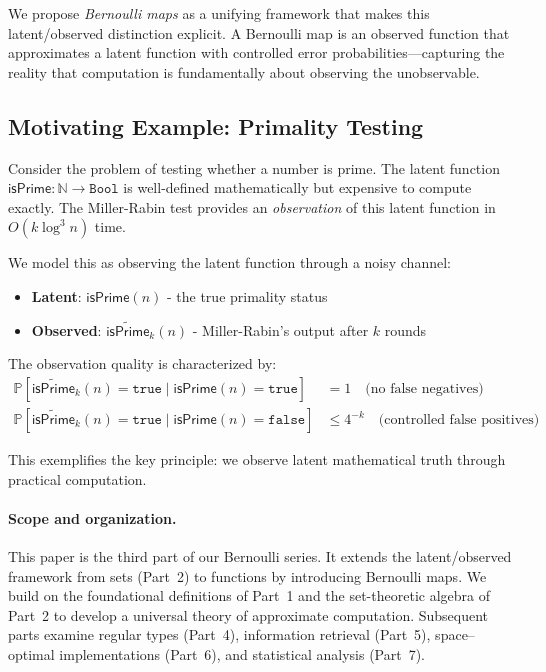 \documentclass[11pt,final,hidelinks]{article}
\newcommand{\obs}[1]{\widetilde{#1}}  %
\newcommand{\Type}[1]{\mathtt{#1}}
\newcommand{\ProbCond}[2]{\mathbb{P}\left[#1 \mid #2\right]}
\newcommand{\Bool}{\Type{Bool}}
\newcommand{\Nat}{\mathbb{N}}
\newcommand{\True}{\mathtt{true}}
\newcommand{\False}{\mathtt{false}}
\begin{document}
We propose \emph{Bernoulli maps} as a unifying framework that makes this latent/observed distinction explicit. A Bernoulli map is an observed function that approximates a latent function with controlled error probabilities—capturing the reality that computation is fundamentally about observing the unobservable.

\subsection{Motivating Example: Primality Testing}

Consider the problem of testing whether a number is prime. The latent function $\mathsf{isPrime} : \Nat \to \Bool$ is well-defined mathematically but expensive to compute exactly. The Miller-Rabin test \cite{miller1976,rabin1980} provides an \emph{observation} of this latent function in $O(k \log^3 n)$ time.

We model this as observing the latent function through a noisy channel:
\begin{itemize}
    \item \textbf{Latent}: $\mathsf{isPrime}(n)$ - the true primality status
    \item \textbf{Observed}: $\obs{\mathsf{isPrime}}_k(n)$ - Miller-Rabin's output after $k$ rounds
\end{itemize}

The observation quality is characterized by:
\begin{align}
\ProbCond{\obs{\mathsf{isPrime}}_k(n) = \True}{\mathsf{isPrime}(n) = \True} &= 1 \quad \text{(no false negatives)} \\
\ProbCond{\obs{\mathsf{isPrime}}_k(n) = \True}{\mathsf{isPrime}(n) = \False} &\leq 4^{-k} \quad \text{(controlled false positives)}
\end{align}

This exemplifies the key principle: we observe latent mathematical truth through practical computation.

\paragraph{Scope and organization.}  This paper is the third part of our Bernoulli series.  It extends the latent/observed framework from sets (Part~2) to functions by introducing Bernoulli maps.  We build on the foundational definitions of Part~1 and the set-theoretic algebra of Part~2 to develop a universal theory of approximate computation.  Subsequent parts examine regular types (Part~4), information retrieval (Part~5), space–optimal implementations (Part~6), and statistical analysis (Part~7).
\end{document}
